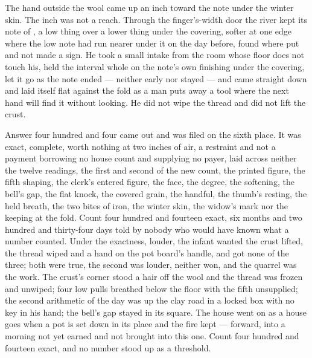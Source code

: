 The hand outside the wool came up an inch toward the note under the winter skin. The inch was not a reach. Through the finger's-width door the river kept its note of , a low thing over a lower thing under the covering, softer at one edge where the low note had run nearer under it on the day before, found where put and not made a sign. He took a small intake from the room whose floor does not touch his, held the interval whole on the note's own finishing under the covering, let it go as the note ended --- neither early nor stayed --- and came straight down and laid itself flat against the fold as a man puts away a tool where the next hand will find it without looking. He did not wipe the thread and did not lift the crust.

Answer four hundred and four came out and was filed on the sixth place. It was exact, complete, worth nothing at two inches of air, a restraint and not a payment borrowing no house count and supplying no payer, laid across neither the twelve readings, the first and second of the new count, the printed figure, the fifth shaping, the clerk's entered figure, the face, the degree, the softening, the bell's gap, the flat knock, the covered grain, the handful, the thumb's resting, the held breath, the two bites of iron, the winter skin, the widow's mark nor the keeping at the fold. Count four hundred and fourteen exact, six months and two hundred and thirty-four days told by nobody who would have known what a number counted. Under the exactness, louder, the infant wanted the crust lifted, the thread wiped and a hand on the pot board's handle, and got none of the three; both were true, the second was louder, neither won, and the quarrel was the work. The crust's corner stood a hair off the wool and the thread was frozen and unwiped; four low pulls breathed below the floor with the fifth unsupplied; the second arithmetic of the day was up the clay road in a locked box with no key in his hand; the bell's gap stayed in its square. The house went on as a house goes when a pot is set down in its place and the fire kept --- forward, into a morning not yet earned and not brought into this one. Count four hundred and fourteen exact, and no number stood up as a threshold.
